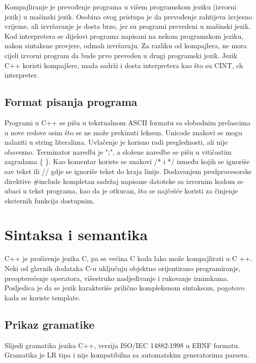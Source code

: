 \documentclass[11pt]{book}
\begin{document}
Kompajliranje je prevođenje programa u višem programskom jeziku (izvorni jezik) u mašinski  jezik.  Osobina  ovog  pristupa  je  da  prevođenje  zahtijeva  izvjesno  vrijeme,  ali izvršavanje  je  dosta  brzo,  jer  su  programi  prevedeni  u  mašinski  jezik.  Kod  interpretera  se dijelovi programa napisani na nekom programskom jeziku, nakon sintaksne provjere, odmah izvršavaju. Za razliku od kompajlera, ne mora cijeli izvorni program da bude prvo preveden u drugi programski jezik. Jezik C++ koristi kompajlere, mada sadrži i dosta interpretera kao što su CINT, ch interpreter.

\subsection {Format pisanja programa}

Programi u C++ se pišu u tekstualnom ASCII formatu sa slobodnim prelascima u nove redove osim što se ne može prekinuti leksem. Unicode znakovi se mogu nalaziti u string literalima. Uvlačenje je korisno radi preglednosti, ali nije obavezno. Terminator naredbi je ";", a složene naredbe se pišu u vitičastim zagradama \{ \}. Kao komentar koriste se znakovi /* i */ između kojih se ignoriše sav tekst ili // gdje se ignoriše tekst do kraja linije. Dodavanjem predprocesorske direktive \#include kompletan sadržaj napisane datoteke sa izvornim kodom se ubaci u tekst programa, kao da je otkucan, što se najčešće koristi za činjenje eksternih funkcija dostupnim.


\section{Sintaksa i semantika}

C++ je proširenje jezika C, pa se većina C koda lako može kompajlirati u C ++. Neki od glavnih dodataka C-u uključuju objektno orijentirano programiranje, preopterećenje operatora, višestruko nasljeđivanje i rukovanje iznimkama. Posljedica je da se jezik karakteriše prilično kompleksnom sintaksom, pogotovo
kada se koriste template.

\subsection{Prikaz gramatike}
Slijedi gramatika jezika C++, verzija ISO/IEC 14882:1998 u EBNF formatu. Gramatika je LR tipa i nije kompatibilna sa
automatskim generatorima parsera.
\end{document}
